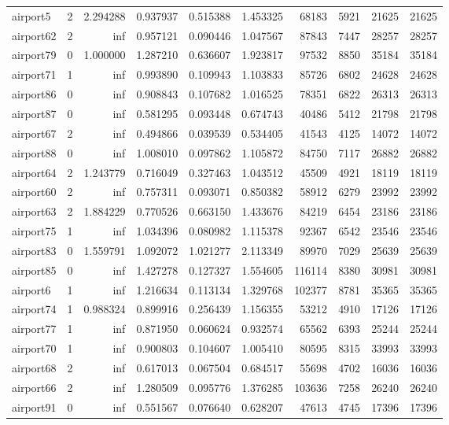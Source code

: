 \begin{longtable}{|l|r|r|r|r|r|r|r|r|r|}
airport5 & 2 & 2.294288 & 0.937937 & 0.515388 & 1.453325 & 68183 & 5921 & 21625 & 21625 \\
airport62 & 2 & inf & 0.957121 & 0.090446 & 1.047567 & 87843 & 7447 & 28257 & 28257 \\
airport79 & 0 & 1.000000 & 1.287210 & 0.636607 & 1.923817 & 97532 & 8850 & 35184 & 35184 \\
airport71 & 1 & inf & 0.993890 & 0.109943 & 1.103833 & 85726 & 6802 & 24628 & 24628 \\
airport86 & 0 & inf & 0.908843 & 0.107682 & 1.016525 & 78351 & 6822 & 26313 & 26313 \\
airport87 & 0 & inf & 0.581295 & 0.093448 & 0.674743 & 40486 & 5412 & 21798 & 21798 \\
airport67 & 2 & inf & 0.494866 & 0.039539 & 0.534405 & 41543 & 4125 & 14072 & 14072 \\
airport88 & 0 & inf & 1.008010 & 0.097862 & 1.105872 & 84750 & 7117 & 26882 & 26882 \\
airport64 & 2 & 1.243779 & 0.716049 & 0.327463 & 1.043512 & 45509 & 4921 & 18119 & 18119 \\
airport60 & 2 & inf & 0.757311 & 0.093071 & 0.850382 & 58912 & 6279 & 23992 & 23992 \\
airport63 & 2 & 1.884229 & 0.770526 & 0.663150 & 1.433676 & 84219 & 6454 & 23186 & 23186 \\
airport75 & 1 & inf & 1.034396 & 0.080982 & 1.115378 & 92367 & 6542 & 23546 & 23546 \\
airport83 & 0 & 1.559791 & 1.092072 & 1.021277 & 2.113349 & 89970 & 7029 & 25639 & 25639 \\
airport85 & 0 & inf & 1.427278 & 0.127327 & 1.554605 & 116114 & 8380 & 30981 & 30981 \\
airport6 & 1 & inf & 1.216634 & 0.113134 & 1.329768 & 102377 & 8781 & 35365 & 35365 \\
airport74 & 1 & 0.988324 & 0.899916 & 0.256439 & 1.156355 & 53212 & 4910 & 17126 & 17126 \\
airport77 & 1 & inf & 0.871950 & 0.060624 & 0.932574 & 65562 & 6393 & 25244 & 25244 \\
airport70 & 1 & inf & 0.900803 & 0.104607 & 1.005410 & 80595 & 8315 & 33993 & 33993 \\
airport68 & 2 & inf & 0.617013 & 0.067504 & 0.684517 & 55698 & 4702 & 16036 & 16036 \\
airport66 & 2 & inf & 1.280509 & 0.095776 & 1.376285 & 103636 & 7258 & 26240 & 26240 \\
airport91 & 0 & inf & 0.551567 & 0.076640 & 0.628207 & 47613 & 4745 & 17396 & 17396 \\

\end{longtable}
